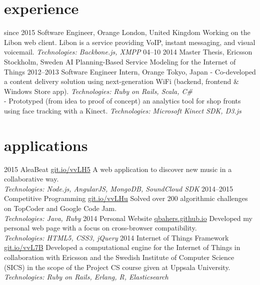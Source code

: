 \documentclass[]{friggeri-cv}
\begin{document}
\section{experience}

\begin{entrylist}
  \entry
    {since 2015}
    {Software Engineer, Orange}
    {London, United Kingdom}
    {Working on the Libon web client. Libon is a service providing VoIP, instant messaging, and visual voicemail.
    \emph{Technologies: Backbone.js, XMPP}}
  \entry
    {04–10 2014}
    {Master Thesis, Ericsson}
    {Stockholm, Sweden}
    {AI Planning-Based Service Modeling for the Internet of Things}
  \entry
    {2012–2013}
    {Software Engineer Intern, Orange}
    {Tokyo, Japan}
    {- Co-developed a content delivery solution using next-generation WiFi 
    (backend, frontend \& Windows Store app).
    \emph{Technologies: Ruby on Rails, Scala, C\#}
    \\
    - Prototyped (from idea to proof of concept) an analytics tool for shop fronts using face tracking with a Kinect. 
    \emph{Technologies: Microsoft Kinect SDK, D3.js}}
\end{entrylist}

\section{applications}

\begin{entrylist}
  \entry
    {2015}
    {AleaBeat}
    {\href{http://git.io/vvLH5}{git.io/vvLH5}}
    {A web application to discover new music in a collaborative way.
    \\ \emph{Technologies: Node.js, AngularJS, MongoDB, SoundCloud SDK}}
  \entry
    {2014–2015}
    {Competitive Programming}
    {\href{http://git.io/vvLHu}{git.io/vvLHu}}
    {Solved over 200 algorithmic challenges on TopCoder and Google Code Jam.
    \\ \emph{Technologies: Java, Ruby}}
  \entry
    {2014}
    {Personal Website}
    {\href{http://qbahers.github.io}{qbahers.github.io}}
    {Developed my personal web page with a focus on cross-browser compatibility.
    \\ \emph{Technologies: HTML5, CSS3, jQuery}}
  \entry
    {2014}
    {Internet of Things Framework}
    {\href{http://git.io/vvL7B}{git.io/vvL7B}}
    {Developed a computational engine for the Internet of Things in collaboration with Ericsson and 
    the Swedish Institute of Computer Science (SICS) in the scope of the Project CS course 
    given at Uppsala University. 
    \\ \emph{Technologies: Ruby on Rails, Erlang, R, Elasticsearch}}
\end{entrylist}
\end{document}

